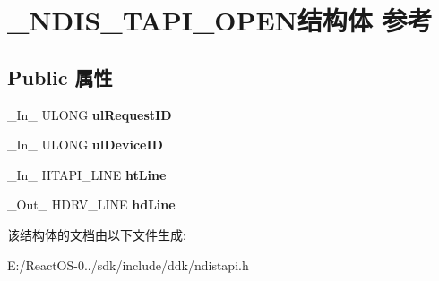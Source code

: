 \hypertarget{struct___n_d_i_s___t_a_p_i___o_p_e_n}{}\section{\+\_\+\+N\+D\+I\+S\+\_\+\+T\+A\+P\+I\+\_\+\+O\+P\+E\+N结构体 参考}
\label{struct___n_d_i_s___t_a_p_i___o_p_e_n}
\subsection*{Public 属性}
\begin{DoxyCompactItemize}
\item 
\mbox{\label{struct___n_d_i_s___t_a_p_i___o_p_e_n_aaec8d686a63dd0984a3e2a4889815a49}} 
\+\_\+\+In\+\_\+ U\+L\+O\+NG {\bfseries ul\+Request\+ID}
\item 
\mbox{\label{struct___n_d_i_s___t_a_p_i___o_p_e_n_a35046abe86b30631e71258004a50b4f6}} 
\+\_\+\+In\+\_\+ U\+L\+O\+NG {\bfseries ul\+Device\+ID}
\item 
\mbox{\label{struct___n_d_i_s___t_a_p_i___o_p_e_n_a3e62c5fbd6afac93a4196a61dccad7b3}} 
\+\_\+\+In\+\_\+ H\+T\+A\+P\+I\+\_\+\+L\+I\+NE {\bfseries ht\+Line}
\item 
\mbox{\label{struct___n_d_i_s___t_a_p_i___o_p_e_n_af14f9d99069cdda8844a0b32292fb06f}} 
\+\_\+\+Out\+\_\+ H\+D\+R\+V\+\_\+\+L\+I\+NE {\bfseries hd\+Line}
\end{DoxyCompactItemize}


该结构体的文档由以下文件生成\+:\begin{DoxyCompactItemize}
\item 
E\+:/\+React\+O\+S-\/0../sdk/include/ddk/ndistapi.\+h\end{DoxyCompactItemize}
